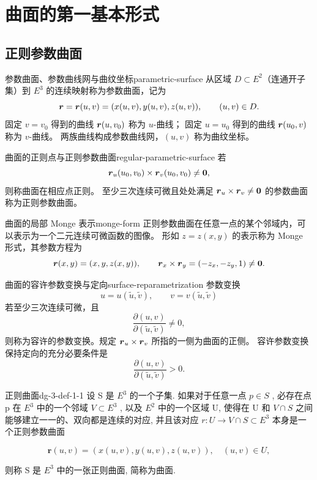 \chapter{曲面的第一基本形式}
\section{正则参数曲面}

\begin{definition}{参数曲面、参数曲线网与曲纹坐标}{parametric-surface}
从区域 $D\subset E^2$（连通开子集）到 $E^3$ 的连续映射称为参数曲面，记为
\[
\boldsymbol{r}=\boldsymbol{r}(u,v)=(x(u,v),y(u,v),z(u,v)),\qquad(u,v)\in D.
\]
固定 $v=v_0$ 得到的曲线 $\boldsymbol{r}(u,v_0)$ 称为 $u$-曲线；
固定 $u=u_0$ 得到的曲线 $\boldsymbol{r}(u_0,v)$ 称为 $v$-曲线。
两族曲线构成参数曲线网，$(u,v)$ 称为曲纹坐标。
\end{definition}

\begin{definition}{曲面的正则点与正则参数曲面}{regular-parametric-surface}
若
\[
\boldsymbol{r}_u(u_0,v_0)\times\boldsymbol{r}_v(u_0,v_0)\neq\boldsymbol{0},
\]
则称曲面在相应点正则。
至少三次连续可微且处处满足 $\boldsymbol{r}_u\times\boldsymbol{r}_v\neq\boldsymbol{0}$
的参数曲面称为正则参数曲面。
\end{definition}

\begin{proposition}{曲面的局部 Monge 表示}{monge-form}
正则参数曲面在任意一点的某个邻域内，可以表示为一个二元连续可微函数的图像。
形如 $z=z(x,y)$ 的表示称为 Monge 形式，其参数方程为
\[
\boldsymbol{r}(x,y)=(x,y,z(x,y)),\qquad
\boldsymbol{r}_x\times\boldsymbol{r}_y=(-z_x,-z_y,1)\neq\boldsymbol{0}.
\]
\end{proposition}

\begin{definition}{曲面的容许参数变换与定向}{surface-reparametrization}
参数变换
\[
u=u(\tilde u,\tilde v),\qquad v=v(\tilde u,\tilde v)
\]
若至少三次连续可微，且
\[
\frac{\partial(u,v)}{\partial(\tilde u,\tilde v)}\neq0,
\]
则称为容许的参数变换。规定 $\boldsymbol{r}_u\times\boldsymbol{r}_v$ 所指的一侧为曲面的正侧。
容许参数变换保持定向的充分必要条件是
\[
\frac{\partial(u,v)}{\partial(\tilde u,\tilde v)}>0.
\]
\end{definition}

\begin{definition}{正则曲面}{dg-3-def-1-1}
设 S 是  \(E^{3}\)  的一个子集. 如果对于任意一点  \(p \in S\) , 必存在点 p 在  \(E^{3}\)  中的一个邻域  \(V \subset E^{3}\) , 以及  \(E^{2}\)  中的一个区域 U, 使得在 U 和  \(V \cap S\)  之间能够建立一一的、双向都是连续的对应, 并且该对应  \(r: U \to V \cap S \subset E^{3}\)  本身是一个正则参数曲面\par

\[
\boldsymbol {r} (u, v) = (x (u, v), y (u, v), z (u, v)), \quad (u, v) \in U,
\]

则称 S 是  \(E^{3}\)  中的一张正则曲面, 简称为曲面.
\end{definition}

